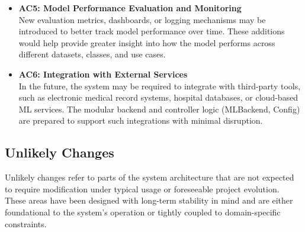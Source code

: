 \documentclass[12pt, titlepage]{article}
\begin{document}
\begin{itemize}
    \item \textbf{AC5: Model Performance Evaluation and Monitoring} \\
    New evaluation metrics, dashboards, or logging mechanisms may be introduced to better track model performance over time. These additions would help provide greater insight into how the model performs across different datasets, classes, and use cases.
    
    \item \textbf{AC6: Integration with External Services} \\
    In the future, the system may be required to integrate with third-party tools, such as electronic medical record systems, hospital databases, or cloud-based ML services. The modular backend and controller logic (MLBackend, Config) are prepared to support such integrations with minimal disruption.
\end{itemize}

\newpage

\subsection{Unlikely Changes}

Unlikely changes refer to parts of the system architecture that are not expected to require modification under typical usage or foreseeable project evolution. These areas have been designed with long-term stability in mind and are either foundational to the system's operation or tightly coupled to domain-specific constraints.
\end{document}
